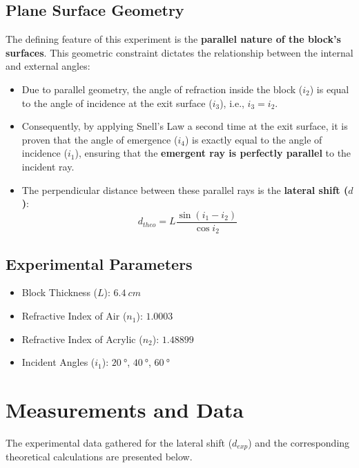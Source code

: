 \documentclass[12pt, a4paper]{article}
\begin{document}
\subsection{Plane Surface Geometry}
The defining feature of this experiment is the \textbf{parallel nature of the block's surfaces}. This geometric constraint dictates the relationship between the internal and external angles:
\begin{itemize}
    \item Due to parallel geometry, the angle of refraction inside the block ($i_2$) is equal to the angle of incidence at the exit surface ($i_3$), i.e., $i_3 = i_2$.
    \item Consequently, by applying Snell's Law a second time at the exit surface, it is proven that the angle of emergence ($i_4$) is exactly equal to the angle of incidence ($i_1$), ensuring that the \textbf{emergent ray is perfectly parallel} to the incident ray.
    \item The perpendicular distance between these parallel rays is the \textbf{lateral shift ($d$)}:
    $$d_{theo} = L \frac{\sin(i_1 - i_2)}{\cos i_2}$$
\end{itemize}

\subsection{Experimental Parameters}
\begin{itemize}
    \item Block Thickness (\(L\)): $\SI{6.4}{cm}$
    \item Refractive Index of Air (\(n_1\)): $1.0003$
    \item Refractive Index of Acrylic (\(n_2\)): $1.48899$
    \item Incident Angles (\(i_1\)): $\SI{20}{\degree}$, $\SI{40}{\degree}$, $\SI{60}{\degree}$
\end{itemize}

\section{Measurements and Data}
The experimental data gathered for the lateral shift ($d_{exp}$) and the corresponding theoretical calculations are presented below.
\end{document}
